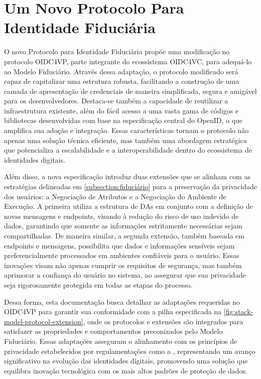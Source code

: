 \chapter{Um Novo Protocolo Para Identidade Fiduciária}\label{ch:protocol}

O novo Protocolo para Identidade Fiduciária propõe uma modificação no protocolo \acs{OIDC4VP}, parte integrante do ecossistema \acs{OIDC4VC}, para adequá-lo ao Modelo Fiduciário. Através dessa adaptação, o protocolo modificado será capaz de capitalizar uma estrutura robusta, facilitando a construção de uma camada de apresentação de credenciais de maneira simplificada, segura e amigável para os desenvolvedores. Destaca-se também a capacidade de reutilizar a infraestrutura existente, além do fácil acesso a uma vasta gama de códigos e bibliotecas desenvolvidas com base na especificação central do OpenID, o que amplifica sua adoção e integração. Essas características tornam o protocolo não apenas uma solução técnica eficiente, mas também uma abordagem estratégica que potencializa a escalabilidade e a interoperabilidade dentro do ecossistema de identidades digitais.



Além disso, a nova especificação introduz duas extensões que se alinham com as estratégias delineadas em \autoref{subsection:fiduciário} para a preservação da privacidade dos usuários: a Negociação de Atributos e a Negociação do Ambiente de Execução. A primeira utiliza a estrutura de \acs{DA}s em conjunto com a definição de novas mensagens e endpoints, visando à redução do risco de uso indevido de dados, garantindo que somente as informações estritamente necessárias sejam compartilhadas. De maneira similar, a segunda extensão, também baseada em  endpoints e mensagens, possibilita que dados e informações sensíveis sejam preferencialmente processados em ambientes confiáveis para o usuário. Essas inovações visam não apenas cumprir os requisitos de segurança, mas também aprimorar a confiança do usuário no sistema, ao assegurar que sua privacidade seja rigorosamente protegida em todas as etapas do processo.

Dessa forma, esta documentação busca detalhar as adaptações requeridas no \acs{OIDC4VP} para garantir sua conformidade com a pilha especificada na \autoref{fig:stack-model-protocol-extension}, onde os protocolos e extensões são integrados para satisfazer as propriedades e comportamentos preconizados pelo Modelo Fiduciário. Essas adaptações asseguram o alinhamento com os princípios de privacidade estabelecidos por regulamentações como a , representando um avanço significativo na evolução das identidades digitais, promovendo uma solução que equilibra inovação tecnológica com os mais altos padrões de proteção de dados.


